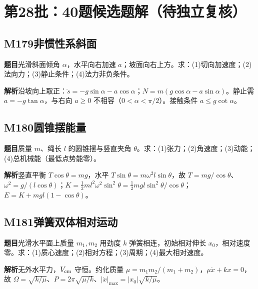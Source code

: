 


\section*{第28批：40题候选题解（待独立复核）}

\subsection*{M179\quad 非惯性系斜面}

\textbf{题目}\quad 光滑斜面倾角 $\alpha$，水平向右加速 $a$；坡面向右上方。求：(1)切向加速度；(2)法向力；(3)静止条件；(4)法力非负条件。

\par\textbf{解析}\quad 沿坡向上取正：$\ddot s=-g\sin\alpha-a\cos\alpha$；$N=m(g\cos\alpha-a\sin\alpha)$。静止需 $a=-g\tan\alpha$，与右向 $a\ge0$ 不相容（$0<\alpha<\pi/2$）。接触条件 $a\le g\cot\alpha$。

\par\medskip

\subsection*{M180\quad 圆锥摆能量}

\textbf{题目}\quad 质量 $m$、绳长 $l$ 的圆锥摆与竖直夹角 $\theta$。求：(1)张力；(2)角速度；(3)动能；(4)总机械能（最低点势能零）。

\par\textbf{解析}\quad 竖直平衡 $T\cos\theta=mg$，水平 $T\sin\theta=m\omega^2l\sin\theta$，故 $T=mg/\cos\theta$、$\omega^2=g/(l\cos\theta)$；$K=\tfrac12ml^2\omega^2\sin^2\theta=\tfrac12mgl\sin^2\theta/\cos\theta$；$E=K+mgl(1-\cos\theta)$。

\par\medskip

\subsection*{M181\quad 弹簧双体相对运动}

\textbf{题目}\quad 光滑水平面上质量 $m_1,m_2$ 用劲度 $k$ 弹簧相连，初始相对伸长 $x_0$，相对速度零。求：(1)质心速度；(2)相对方程；(3)周期；(4)最大相对速度。

\par\textbf{解析}\quad 无外水平力，$V_{\rm cm}$ 守恒。约化质量 $\mu=m_1m_2/(m_1+m_2)$，$\mu\ddot x+kx=0$，故 $\Omega=\sqrt{k/\mu}$、$P=2\pi\sqrt{\mu/k}$、$|\dot x|_{\max}=|x_0|\sqrt{k/\mu}$。

